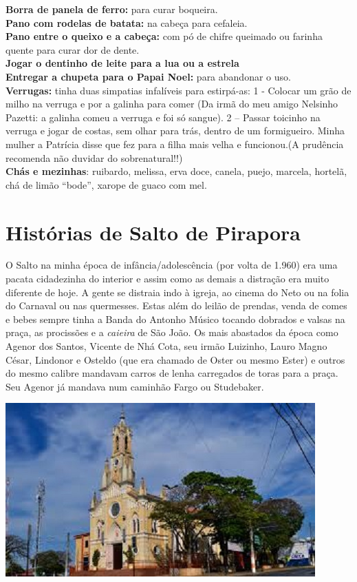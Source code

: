 \documentclass[12pt,brazil,]{book}
\begin{document}
\textbf{Borra de panela de ferro:} para curar boqueira.\\
\textbf{Pano com rodelas de batata:} na cabeça para cefaleia.\\
\textbf{Pano entre o queixo e a cabeça:} com pó de chifre queimado ou
farinha quente para curar dor de dente.\\
\textbf{Jogar o dentinho de leite para a lua ou a estrela}\\
\textbf{Entregar a chupeta para o Papai Noel:} para abandonar o uso.\\
\textbf{Verrugas:} tinha duas simpatias infalíveis para estirpá-as: 1 -
Colocar um grão de milho na verruga e por a galinha para comer (Da irmã
do meu amigo Nelsinho Pazetti: a galinha comeu a verruga e foi só
sangue). 2 -- Passar toicinho na verruga e jogar de costas, sem olhar
para trás, dentro de um formigueiro. Minha mulher a Patrícia disse que
fez para a filha mais velha e funcionou.(A prudência recomenda não
duvidar do sobrenatural!!)\\
\textbf{Chás e mezinhas}: ruibardo, melissa, erva doce, canela, puejo,
marcela, hortelã, chá de limão ``bode'', xarope de guaco com mel.

\chapter{Histórias de Salto de
Pirapora}\label{histuxf3rias-de-salto-de-pirapora}

O Salto na minha época de infância/adolescência (por volta de 1.960) era
uma pacata cidadezinha do interior e assim como as demais a distração
era muito diferente de hoje. A gente se distraia indo à igreja, ao
cinema do Neto ou na folia do Carnaval ou nas quermesses. Estas além do
leilão de prendas, venda de comes e bebes sempre tinha a Banda do
Antonho Músico tocando dobrados e valsas na praça, as procissões e a
\emph{caieira} de São João. Os mais abastados da época como Agenor dos
Santos, Vicente de Nhá Cota, seu irmão Luizinho, Lauro Magno César,
Lindonor e Osteldo (que era chamado de Oster ou mesmo Ester) e outros do
mesmo calibre mandavam carros de lenha carregados de toras para a praça.
Seu Agenor já mandava num caminhão Fargo ou Studebaker.

\includegraphics{Imagens/Igreja.jpeg}
\end{document}
